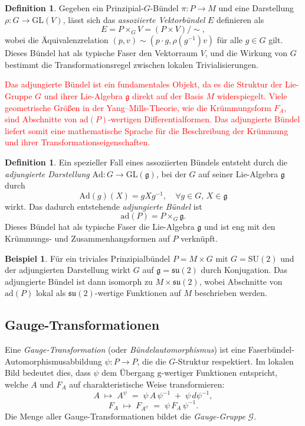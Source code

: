 \documentclass[10pt, letterpaper]{article}
\newcommand{\entwurf}[1]{\textcolor{red}{#1}} %
\theoremstyle{custom}
\theoremstyle{definition}
\newtheorem{definition}[theorem]{Definition}
\newtheorem{example}[theorem]{Beispiel}
\begin{document}
\begin{definition}
Gegeben ein Prinzipial-\(G\)-Bündel \(\pi: P \to M\) und eine Darstellung \(\rho: G \to \mathrm{GL}(V)\), lässt sich das \emph{assoziierte Vektorbündel} \(E\) definieren als
\[
E = P \times_G V = (P \times V) / \sim,
\]
wobei die Äquivalenzrelation \((p, v) \sim (p \cdot g, \rho(g^{-1}) v)\) für alle \(g \in G\) gilt. Dieses Bündel hat als typische Faser den Vektorraum \(V\), und die Wirkung von \(G\) bestimmt die Transformationsregel zwischen lokalen Trivialisierungen.
\end{definition}


\entwurf{Das adjungierte Bündel ist ein fundamentales Objekt, da es die Struktur der Lie-Gruppe \(G\) und ihrer Lie-Algebra \(\mathfrak{g}\) direkt auf der Basis \(M\) widerspiegelt. Viele geometrische Größen in der Yang--Mills-Theorie, wie die Krümmungsform \(F_A\), sind Abschnitte von \(\mathrm{ad}(P)\)-wertigen Differentialformen. Das adjungierte Bündel liefert somit eine mathematische Sprache für die Beschreibung der Krümmung und ihrer Transformationseigenschaften.}

\begin{definition}
Ein spezieller Fall eines assoziierten Bündels entsteht durch die \emph{adjungierte Darstellung} \(\mathrm{Ad}: G \to \mathrm{GL}(\mathfrak{g})\), bei der \(G\) auf seiner Lie-Algebra \(\mathfrak{g}\) durch
\[
\mathrm{Ad}(g)(X) = g X g^{-1}, \quad \forall g \in G, \, X \in \mathfrak{g}
\]
wirkt. Das dadurch entstehende \emph{adjungierte Bündel} ist
\[
\mathrm{ad}(P) = P \times_G \mathfrak{g}.
\]
Dieses Bündel hat als typische Faser die Lie-Algebra \(\mathfrak{g}\) und ist eng mit den Krümmungs- und Zusammenhangsformen auf \(P\) verknüpft.
\end{definition}

\begin{example}
Für ein triviales Prinzipialbündel \(P = M \times G\) mit \(G = \mathrm{SU}(2)\) und der adjungierten Darstellung wirkt \(G\) auf \(\mathfrak{g} = \mathfrak{su}(2)\) durch Konjugation. Das adjungierte Bündel ist dann isomorph zu \(M \times \mathfrak{su}(2)\), wobei Abschnitte von \(\mathrm{ad}(P)\) lokal als \(\mathfrak{su}(2)\)-wertige Funktionen auf \(M\) beschrieben werden.
\end{example}




\subsection{Gauge-Transformationen}
Eine \emph{Gauge-Transformation} (oder \emph{Bündelautomorphismus}) ist eine Faserbündel-Automorphismusabbildung \(\psi: P \to P\), die die \(G\)-Struktur respektiert.  
Im lokalen Bild bedeutet dies, dass \(\psi\) dem Übergang \(\mathrm{g}\)-wertiger Funktionen entspricht, welche \(A\) und \(F_A\) auf charakteristische Weise transformieren:
\[
A \;\mapsto\; A^\psi \;=\; \psi\,A\,\psi^{-1} \;+\; \psi\,d\psi^{-1},
\]
\[
F_A \;\mapsto\; F_{A^\psi} \;=\; \psi\,F_A\,\psi^{-1}.
\]
Die Menge aller Gauge-Transformationen bildet die \emph{Gauge-Gruppe} \(\mathcal{G}\).
\end{document}
